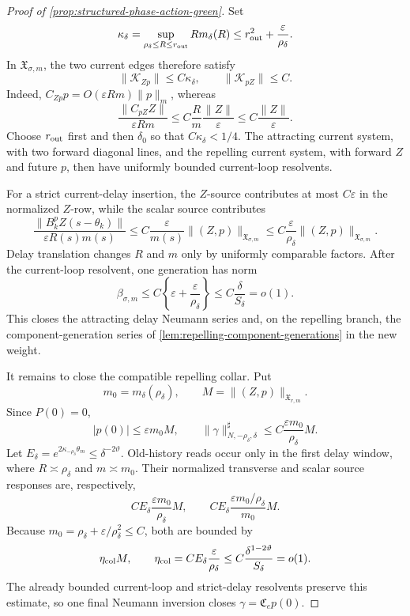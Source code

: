 \begin{proof}[Proof of
\cref{prop:structured-phase-action-green}]
Set
\begin{equation}
 \kappa_\delta
 =\sup_{\rho_\delta\le R\le r_{\rm out}}Rm_\delta(R)
 \le r_{\rm out}^2+\frac{\varepsilon}{\rho_\delta}.          \label{eq:phase-action-current-size}
\end{equation}
In \(\mathfrak X_{\sigma,m}\), the two current edges therefore satisfy
\begin{equation}
 \|\mathcal K_{Zp}\|\le C\kappa_\delta,\qquad
 \|\mathcal K_{pZ}\|\le C.                         \label{eq:phase-action-current-loop}
\end{equation}
Indeed, \(C_{Zp}p=O(\varepsilon Rm)\|p\|_m\), whereas
\[
 \frac{\|C_{pZ}Z\|}{\varepsilon Rm}
 \le C\frac{R}{m}\frac{\|Z\|}{\varepsilon}
 \le C\frac{\|Z\|}{\varepsilon}.
\]
Choose \(r_{\rm out}\) first and then \(\delta_0\) so that
\(C\kappa_\delta<1/4\).  The attracting current system, with two forward
diagonal lines, and the repelling current system, with forward \(Z\) and
future \(p\), then have uniformly bounded current-loop resolvents.

For a strict current-delay insertion, the \(Z\)-source contributes at most
\(C\varepsilon\) in the normalized \(Z\)-row, while the scalar source
contributes
\[
 \frac{\|B_k^pZ(s-\theta_k)\|}{\varepsilon R(s)m(s)}
 \le C\frac{\varepsilon}{m(s)}
       \|(Z,p)\|_{\mathfrak X_{\sigma,m}}
 \le C\frac{\varepsilon}{\rho_\delta}
       \|(Z,p)\|_{\mathfrak X_{\sigma,m}}.
\]
Delay translation changes \(R\) and \(m\) only by uniformly comparable
factors.  After the current-loop resolvent, one generation has norm
\begin{equation}
 \beta_{\sigma,m}
 \le C\left\{\varepsilon+\frac{\varepsilon}{\rho_\delta}\right\}
 \le C\frac\delta{S_\delta}=o(1).                  \label{eq:phase-action-generation-number}
\end{equation}
This closes the attracting delay Neumann series and, on the repelling
branch, the component-generation series of
\cref{lem:repelling-component-generations} in the new weight.

It remains to close the compatible repelling collar.  Put
\[
 m_0=m_\delta(\rho_\delta),\qquad
 M=\|(Z,p)\|_{\mathfrak X_{r,m}}.
\]
Since \(P(0)=0\),
\[
 |p(0)|\le\varepsilon m_0M,\qquad
 \|\gamma\|_{N,-\rho_\delta,\delta}^{\sharp}
 \le C\frac{\varepsilon m_0}{\rho_\delta}M.
\]
Let
\(E_\delta=e^{2\kappa_{-\rho_\delta}\theta_m}
\le\delta^{-2\vartheta}\).
Old-history reads occur only in the first delay window, where
\(R\asymp\rho_\delta\) and \(m\asymp m_0\).  Their normalized transverse
and scalar source responses are, respectively,
\[
 CE_\delta\frac{\varepsilon m_0}{\rho_\delta}M,
 \qquad
 CE_\delta\frac{\varepsilon m_0/\rho_\delta}{m_0}M.
\]
Because \(m_0=\rho_\delta+\varepsilon/\rho_\delta^2\le C\), both are
bounded by
\begin{equation}
 \eta_{\rm col}M,\qquad
 \eta_{\rm col}=CE_\delta\frac{\varepsilon}{\rho_\delta}
 \le C\frac{\delta^{1-2\vartheta}}{S_\delta}=o(1). \label{eq:phase-action-collar-feedback-number}
\end{equation}
The already bounded current-loop and strict-delay resolvents preserve this
estimate, so one final Neumann inversion closes
\(\gamma=\mathfrak C_ep(0)\).


\end{proof}
